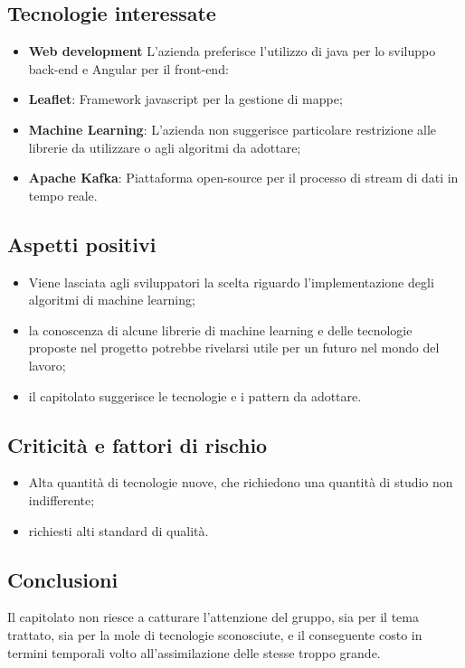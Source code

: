 \subsection{Tecnologie interessate}
\begin{itemize}
    \item \textbf{Web development} L'azienda preferisce l'utilizzo di java per lo sviluppo back-end e Angular per il front-end:
    \item \textbf{Leaflet}: Framework javascript per la gestione di mappe;
    \item \textbf{Machine Learning}: L'azienda non suggerisce particolare restrizione alle librerie da utilizzare o agli algoritmi da adottare;
    \item \textbf{Apache Kafka}: Piattaforma open-source per il processo di stream di dati in tempo reale.
\end{itemize}
\subsection{Aspetti positivi}
\begin{itemize}
    \item Viene lasciata agli sviluppatori la scelta riguardo l'implementazione degli algoritmi di machine learning;
    \item la conoscenza di alcune librerie di machine learning e delle tecnologie proposte nel progetto potrebbe rivelarsi utile per un futuro nel mondo del lavoro;
    \item il capitolato suggerisce le tecnologie e i pattern da adottare.
\end{itemize}
\subsection{Criticità e fattori di rischio}
\begin{itemize}
    \item Alta quantità di tecnologie nuove, che richiedono una quantità di studio non indifferente;
    \item richiesti alti standard di qualità.
\end{itemize}
\subsection{Conclusioni}
Il capitolato non riesce a catturare l'attenzione del gruppo, sia per il tema trattato, sia per la mole di tecnologie sconosciute, e il conseguente costo in termini temporali volto all'assimilazione delle stesse troppo grande.
